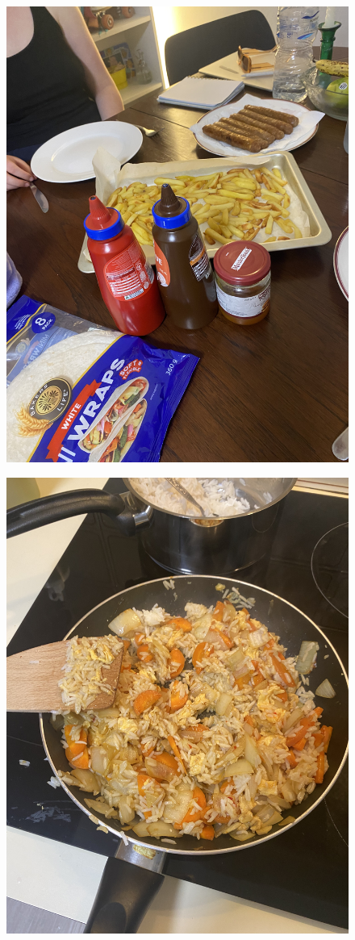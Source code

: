 \documentclass[]{article}
\begin{document}
\newpage\begin{figure}[H]
\begin{center}\hyperref[rec:Sausages and Chips]{\includegraphics[keepaspectratio,width=\textheight,height=\textwidth,angle=-90]{Gallery/Sausages and Chips}}\caption*{}\label{fig:Sausages and Chips}\end{center}
\end{figure}
\newpage\begin{figure}[H]
\begin{center}\hyperref[rec:Egg Fried Rice]{\includegraphics[keepaspectratio,width=\textheight,height=\textwidth,angle=-90]{Gallery/Egg Fried Rice}}\caption*{}\label{fig:Egg Fried Rice}\end{center}
\end{figure}
\end{document}
